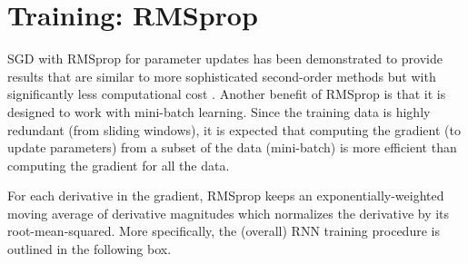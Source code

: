 \section{Training: RMSprop}
\label{sec:training}

SGD with RMSprop \cite{Tieleman2012} for parameter updates has been demonstrated to provide results that are similar to more sophisticated second-order methods but with significantly less computational cost \cite{Dauphin}.
%
Another benefit of RMSprop is that it is designed to work with mini-batch learning.
%
Since the training data is highly redundant (from sliding windows), it is expected that computing the gradient (to update parameters) from a subset of the data (mini-batch) is more efficient than computing the gradient for all the data.


For each derivative in the gradient, RMSprop keeps an exponentially-weighted moving average of derivative magnitudes which normalizes the derivative by its root-mean-squared.
%
More specifically, the (overall) RNN training procedure is outlined in the following box.



